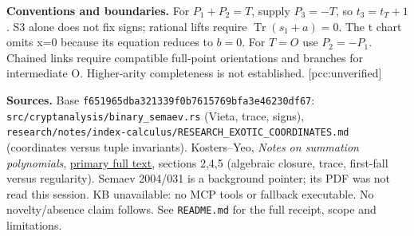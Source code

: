 \documentclass[10pt]{article}
\begin{document}
\textbf{Conventions and boundaries.} For $P_1+P_2=T$, supply $P_3=-T$, so $t_3=t_T+1$. S3 alone does not fix signs; rational lifts require $\operatorname{Tr}(s_1+a)=0$. The t chart omits x=0 because its equation reduces to $b=0$. For $T=O$ use $P_2=-P_1$. Chained links require compatible full-point orientations and branches for intermediate O. Higher-arity completeness is not established. [pcc:unverified]

\textbf{Sources.} Base \texttt{f651965dba321339f0b7615769bfa3e46230df67}:
\texttt{src/cryptanalysis/binary\_semaev.rs} (Vieta, trace, signs),
\texttt{research/notes/index-calculus/RESEARCH\_EXOTIC\_COORDINATES.md} (coordinates versus tuple invariants).
Kosters--Yeo, \emph{Notes on summation polynomials},
\href{https://arxiv.org/html/1503.08001v2}{primary full text}, sections 2,4,5 (algebraic closure, trace, first-fall versus regularity).
Semaev 2004/031 is a background pointer; its PDF was not read this session.
KB unavailable: no MCP tools or fallback executable. No novelty/absence claim follows. See \texttt{README.md} for the full receipt, scope and limitations.
\end{document}
